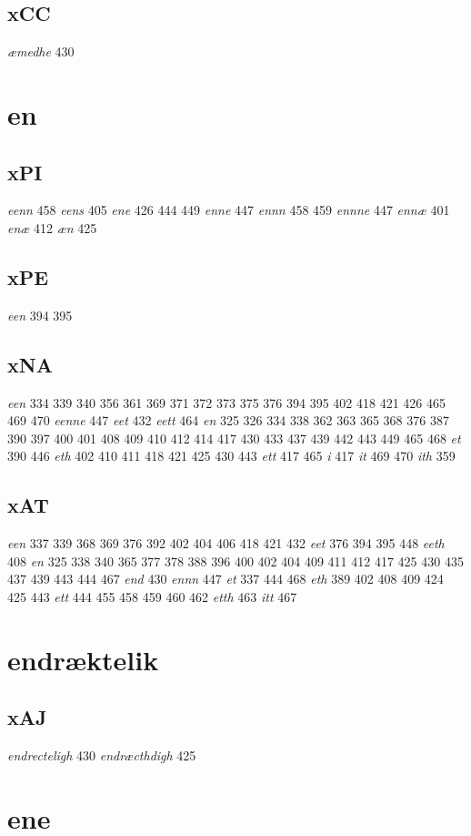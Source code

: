 \documentclass[a4paper,twocolumn]{article}
\begin{document}
\subsection{xCC}
\label{sec:org9173819}
\emph{æmedhe} 430 
\section{en}
\label{sec:org69473c5}
\subsection{xPI}
\label{sec:org1cead09}
\emph{eenn} 458 \emph{eens} 405 \emph{ene} 426 444 449 \emph{enne} 447 \emph{ennn} 458 459 \emph{ennne} 447 \emph{ennæ} 401 \emph{enæ} 412 \emph{æn} 425 
\subsection{xPE}
\label{sec:org2530b8b}
\emph{een} 394 395 
\subsection{xNA}
\label{sec:org80c06af}
\emph{een} 334 339 340 356 361 369 371 372 373 375 376 394 395 402 418 421 426 465 469 470 \emph{eenne} 447 \emph{eet} 432 \emph{eett} 464 \emph{en} 325 326 334 338 362 363 365 368 376 387 390 397 400 401 408 409 410 412 414 417 430 433 437 439 442 443 449 465 468 \emph{et} 390 446 \emph{eth} 402 410 411 418 421 425 430 443 \emph{ett} 417 465 \emph{i} 417 \emph{it} 469 470 \emph{ith} 359 
\subsection{xAT}
\label{sec:org0d0bbfd}
\emph{een} 337 339 368 369 376 392 402 404 406 418 421 432 \emph{eet} 376 394 395 448 \emph{eeth} 408 \emph{en} 325 338 340 365 377 378 388 396 400 402 404 409 411 412 417 425 430 435 437 439 443 444 467 \emph{end} 430 \emph{ennn} 447 \emph{et} 337 444 468 \emph{eth} 389 402 408 409 424 425 443 \emph{ett} 444 455 458 459 460 462 \emph{etth} 463 \emph{itt} 467 
\section{endræktelik}
\label{sec:org4e04694}
\subsection{xAJ}
\label{sec:org5d2e478}
\emph{endrecteligh} 430 \emph{endræcthdigh} 425 
\section{ene}
\label{sec:org7483e1c}
\end{document}

